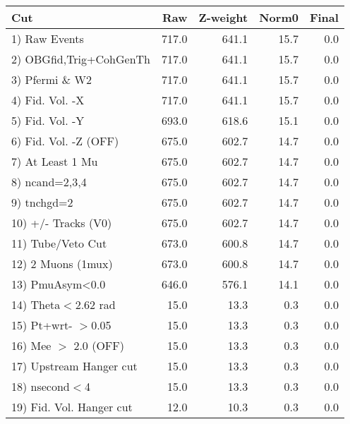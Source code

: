 \begin{table}[h!]\centering
 \begin{tabular}{||l||r|r|r|r||}
 \hline
 \hline
 Cut & Raw & Z-weight & Norm0 & Final \\
 \hline
  1) Raw Events           &       717.0 &       641.1 &        15.7 &         0.0 \\
  2) OBGfid,Trig+CohGenTh &       717.0 &       641.1 &        15.7 &         0.0 \\
  3) Pfermi \& W2         &       717.0 &       641.1 &        15.7 &         0.0 \\
  4) Fid. Vol. -X         &       717.0 &       641.1 &        15.7 &         0.0 \\
  5) Fid. Vol. -Y         &       693.0 &       618.6 &        15.1 &         0.0 \\
  6) Fid. Vol. -Z (OFF)   &       675.0 &       602.7 &        14.7 &         0.0 \\
  7) At Least 1 Mu        &       675.0 &       602.7 &        14.7 &         0.0 \\
  8) ncand=2,3,4          &       675.0 &       602.7 &        14.7 &         0.0 \\
  9) tnchgd=2             &       675.0 &       602.7 &        14.7 &         0.0 \\
 10) +/- Tracks (V0)      &       675.0 &       602.7 &        14.7 &         0.0 \\
 11) Tube/Veto Cut        &       673.0 &       600.8 &        14.7 &         0.0 \\
 12) 2 Muons (1mux)       &       673.0 &       600.8 &        14.7 &         0.0 \\
 13) PmuAsym<0.0          &       646.0 &       576.1 &        14.1 &         0.0 \\
 14) Theta$<$2.62 rad     &        15.0 &        13.3 &         0.3 &         0.0 \\
 15) Pt+wrt- $>$0.05      &        15.0 &        13.3 &         0.3 &         0.0 \\
 16) Mee $>$ 2.0  (OFF)   &        15.0 &        13.3 &         0.3 &         0.0 \\
 17) Upstream Hanger cut  &        15.0 &        13.3 &         0.3 &         0.0 \\
 18) nsecond$<$4          &        15.0 &        13.3 &         0.3 &         0.0 \\
 19) Fid. Vol. Hanger cut &        12.0 &        10.3 &         0.3 &         0.0 \\

\end{tabular}
\end{table}

